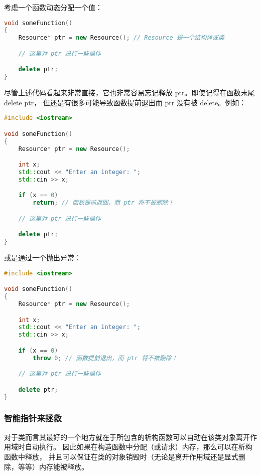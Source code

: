 \documentclass[../../LearnCpp.tex]{subfiles}
\begin{document}

考虑一个函数动态分配一个值：

\begin{lstlisting}[language=C++]
void someFunction()
{
    Resource* ptr = new Resource(); // Resource 是一个结构体或类

    // 这里对 ptr 进行一些操作

    delete ptr;
}
\end{lstlisting}

尽管上述代码看起来非常直接，它也非常容易忘记释放 ptr。即使记得在函数末尾 delete ptr，
但还是有很多可能导致函数提前退出而 ptr 没有被 delete。例如：

\begin{lstlisting}[language=C++]
#include <iostream>

void someFunction()
{
    Resource* ptr = new Resource();

    int x;
    std::cout << "Enter an integer: ";
    std::cin >> x;

    if (x == 0)
        return; // 函数提前返回，而 ptr 将不被删除！

    // 这里对 ptr 进行一些操作

    delete ptr;
}
\end{lstlisting}

或是通过一个抛出异常：

\begin{lstlisting}[language=C++]
#include <iostream>

void someFunction()
{
    Resource* ptr = new Resource();

    int x;
    std::cout << "Enter an integer: ";
    std::cin >> x;

    if (x == 0)
        throw 0; // 函数提前退出，而 ptr 将不被删除！

    // 这里对 ptr 进行一些操作

    delete ptr;
}
\end{lstlisting}

\subsubsection*{智能指针来拯救}

对于类而言其最好的一个地方就在于所包含的析构函数可以自动在该类对象离开作用域时自动执行。
因此如果在构造函数中分配（或请求）内存，那么可以在析构函数中释放，
并且可以保证在类的对象销毁时（无论是离开作用域还是显式删除，等等）内存能被释放。
\end{document}
